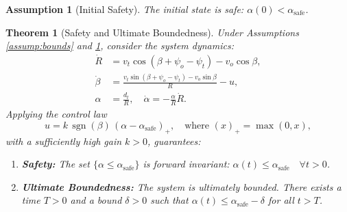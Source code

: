 \documentclass[10pt]{article}
\DeclareMathOperator{\sgn}{sgn}
\newtheorem{theorem}{Theorem}
\newtheorem{assumption}{Assumption}
\begin{document}
\begin{assumption}[Initial Safety]\label{assump:init}
    The initial state is safe: $\alpha(0) < \alpha_{\text{safe}}$.
\end{assumption}

\begin{theorem}[Safety and Ultimate Boundedness]\label{thm:main}
    Under Assumptions \ref{assump:bounds} and \ref{assump:init}, consider the system dynamics:
    \begin{align}
        \dot{R} &= v_t \cos(\beta + \psi_o - \psi_t) - v_o \cos \beta, \label{eq:rdot} \\
        \dot{\beta} &= \frac{v_t \sin(\beta + \psi_o - \psi_t) - v_o \sin \beta}{R} - u, \label{eq:betadot} \\
        \alpha &= \frac{d_t}{R}, \quad \dot{\alpha} = -\frac{\alpha}{R} \dot{R}. \label{eq:adot}
    \end{align}
    Applying the control law
    \begin{equation}\label{eq:control}
        u = k \, \sgn(\beta) \, (\alpha - \alpha_{\text{safe}})_+, \quad \text{where } (x)_+ = \max(0, x),
    \end{equation}
    with a sufficiently high gain $k > 0$, guarantees:
    \begin{enumerate}
        \item \textbf{Safety:} The set $\{ \alpha \leq \alpha_{\text{safe}} \}$ is forward invariant: $\alpha(t) \leq \alpha_{\text{safe}} \quad \forall t > 0$.
        \item \textbf{Ultimate Boundedness:} The system is ultimately bounded. There exists a time $T > 0$ and a bound $\delta > 0$ such that $\alpha(t) \leq \alpha_{\text{safe}} - \delta$ for all $t > T$.
    \end{enumerate}
\end{theorem}
\end{document}
